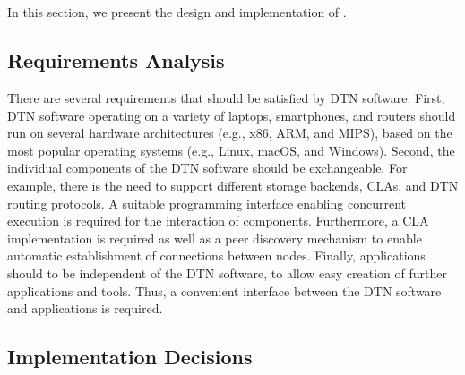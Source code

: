 \section{\dtn}
\label{penning2019dtn7:sec:implementation}

In this section, we present the design and implementation of \dtn. 

\subsection{Requirements Analysis}
There are several requirements that should be satisfied by DTN software. First, DTN software operating on a variety of laptops, smartphones, and routers should run on several hardware architectures (e.g., x86, ARM, and MIPS), based on the most popular operating systems (e.g., Linux, macOS, and Windows).
Second, the individual components of the DTN software should be exchangeable.
For example, there is the need to support different storage backends, CLAs, and DTN routing protocols.
A suitable programming interface enabling concurrent execution is required for the interaction of components.  
Furthermore, a CLA implementation is required as well as a peer discovery mechanism to enable automatic establishment of connections between nodes.
Finally, applications should to be independent of the DTN software, to allow easy creation of further applications and tools.
Thus, a convenient interface between the DTN software and applications is required.



\subsection{Implementation Decisions}

